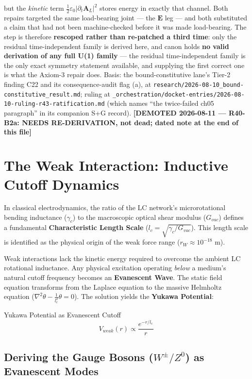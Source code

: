 but the \emph{kinetic} term $\tfrac12\varepsilon_0|\partial_t\mathbf{A}_L|^2$ stores energy in exactly that channel. Both repairs targeted the same load-bearing joint --- the $\mathbf{E}$ leg --- and both substituted a claim that had not been machine-checked before it was made load-bearing. The step is therefore \textbf{rescoped rather than re-patched a third time}: only the residual time-independent family is derived here, and canon holds \textbf{no valid derivation of any full U(1) family} --- the residual time-independent family is the only exact symmetry statement available, and supplying the first correct one is what the Axiom-3 repair does. Basis: the bound-constitutive lane's Tier-2 finding C22 and its consequence-audit flag (a), at \texttt{research/2026-08-10\_bound-constitutive\_result.md}; ruling at \texttt{\_orchestration/docket-entries/2026-08-10-ruling-r43-ratification.md} (which names ``the twice-failed ch05 paragraph'' in its companion S+G record). \textbf{[DEMOTED 2026-08-11 --- R40-B2a: NEEDS RE-DERIVATION, not dead; dated note at the end of this file]}

\section{The Weak Interaction: Inductive Cutoff Dynamics}
In classical electrodynamics, the ratio of the LC network's microrotational bending inductance ($\gamma_c$) to the macroscopic optical shear modulus ($G_{vac}$) defines a fundamental \textbf{Characteristic Length Scale} ($l_c = \sqrt{\gamma_c/G_{vac}}$). This length scale is identified as the physical origin of the weak force range ($r_W \approx 10^{-18}$ m).

Weak interactions lack the kinetic energy required to overcome the ambient LC rotational inductance. Any physical excitation operating \textit{below} a medium's natural cutoff frequency becomes an \textbf{Evanescent Wave}. The static field equation transforms from the Laplace equation to the massive Helmholtz equation ($\nabla^2 \theta - \frac{1}{l_c^2}\theta = 0$). The solution yields the \textbf{Yukawa Potential}:
\begin{resultbox}{Yukawa Potential as Evanescent Cutoff}
\begin{equation}
    V_{weak}(r) \propto \frac{e^{-r/l_c}}{r}
\end{equation}
\end{resultbox}

\subsection{Deriving the Gauge Bosons (\texorpdfstring{$W^{\pm}/Z^{0}$}{W/Z}) as Evanescent Modes}

